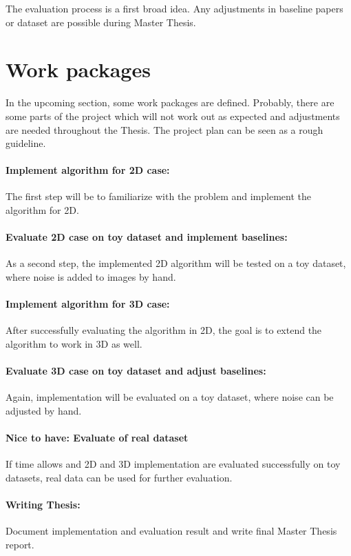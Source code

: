 The evaluation process is a first broad idea. Any adjustments in baseline papers or dataset are possible during 
Master Thesis.

\section{Work packages}
In the upcoming section, some work packages are defined.
Probably, there are some parts of the project which will not work out as expected and 
adjustments are needed throughout the Thesis.
The project plan can be seen as a rough guideline.

\paragraph{Implement algorithm for 2D case:}
The first step will be to familiarize with the problem and implement
the algorithm for 2D. 

\paragraph{Evaluate 2D case on toy dataset and implement baselines:}
As a second step, the implemented 2D algorithm will be tested on a toy dataset,
where noise is added to images by hand. 

\paragraph{Implement algorithm for 3D case:}
After successfully evaluating the algorithm in 2D, the goal is to extend the algorithm to work in 3D as well.

\paragraph{Evaluate 3D case on toy dataset and adjust baselines:}
Again, implementation will be evaluated on a toy dataset, where noise can be adjusted by hand.


\paragraph{Nice to have: Evaluate of real dataset}
If time allows and 2D and 3D implementation are evaluated successfully on toy datasets, 
real data can be used for further evaluation.


\paragraph{Writing Thesis:}
Document implementation and evaluation result and write final Master Thesis report.


